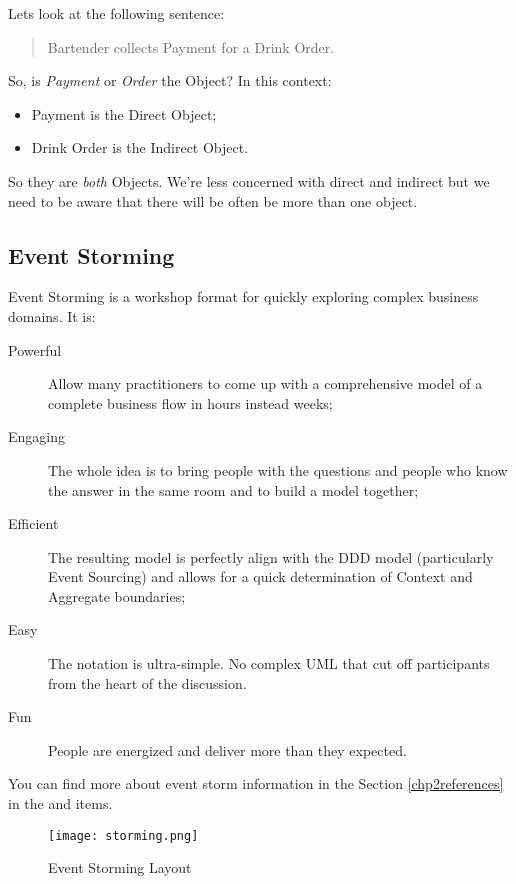 Lets look at the following sentence:
\begin{quote}
    Bartender collects Payment for a Drink Order.
\end{quote}

So, is \emph{Payment} or \emph{Order} the Object? 
In this context:
\begin{itemize}
    \item Payment is the Direct Object;
    \item Drink Order is the Indirect Object.
\end{itemize}

So they are \emph{both} Objects. We're less concerned with direct and indirect but we need to be aware that there will be often be more than one object. 

\subsection{Event Storming}

Event Storming is a workshop format for quickly exploring complex business domains. It is:
\begin{description}
    \item[Powerful] Allow many practitioners to come up with a comprehensive model of a complete business flow in hours instead weeks;
    \item[Engaging] The whole idea is to bring people with the questions and people who know the answer in the same room and to build a model together;
    \item[Efficient] The resulting model is perfectly align with the DDD model (particularly Event Sourcing) and allows for a quick determination of Context and Aggregate boundaries;
    \item[Easy] The notation is ultra-simple. No complex UML that cut off participants from the heart of the discussion.
    \item[Fun] People are energized and deliver more than they expected.
\end{description}

You can find more about event storm information in the Section \ref{chp2references} in the \cite{wiksto20} and \cite{albbra13} items.

\begin{figure}[ht]
\caption{Event Storming Layout}
\centering
\texttt{[image: storming.png]}
 \label{fig:storming}
\end{figure}

